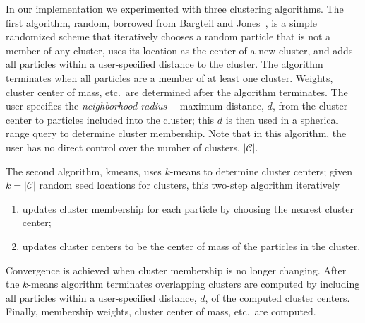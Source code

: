 \documentclass[review]{acmsiggraph}
\begin{document}
In our implementation we experimented with three clustering algorithms.  The first algorithm, $\mathrm{random}$,
borrowed from Bargteil and Jones~, is a simple randomized scheme that iteratively
chooses a random particle that is not a member of any cluster,
uses its location as the center of a new cluster, and adds all particles within a user-specified distance to the cluster.  
The algorithm terminates when all particles are a member of at least one cluster.  Weights, cluster center of mass, etc.\ are
determined after the algorithm terminates.  The user specifies the {\em neighborhood radius}--- 
maximum distance, $d$, from the cluster center to particles
included into the cluster; this $d$ is then used in a spherical range query to determine cluster membership.
Note that in this algorithm, the user has no direct control over the number of clusters, $|\mathcal{C}|$.

The second algorithm, $\mathrm{kmeans}$, uses $k$-means to determine cluster centers; given $k = |\mathcal{C}|$ 
random seed locations for clusters, this two-step algorithm iteratively
\begin{enumerate}
\item updates cluster membership for each particle by choosing the nearest cluster center;
\item updates cluster centers to be the center of mass of the particles in the cluster.
\end{enumerate}
Convergence is achieved when cluster membership is no longer changing.  
After the $k$-means algorithm terminates overlapping clusters are computed by including
all particles within a user-specified distance, $d$, of the computed cluster centers.  
Finally, membership weights, cluster center of mass, etc.\ are computed.
\end{document}
